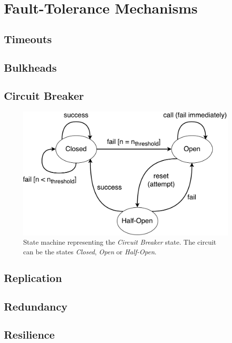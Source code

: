 \section{Fault-Tolerance Mechanisms}

\subsection{Timeouts}

\subsection{Bulkheads}

\subsection{Circuit Breaker}

\begin{figure}[H]
\centering
\includegraphics[width=\textwidth]{../media/CircuitBreakerState.pdf} 
\caption{State machine representing the \textit{Circuit Breaker} state. The
	circuit can be the states \textit{Closed}, \textit{Open} or 
	\textit{Half-Open}.}
\label{fig:circuitbreakerstate}
\end{figure}

\subsection{Replication}

\subsection{Redundancy}

\subsection{Resilience}

